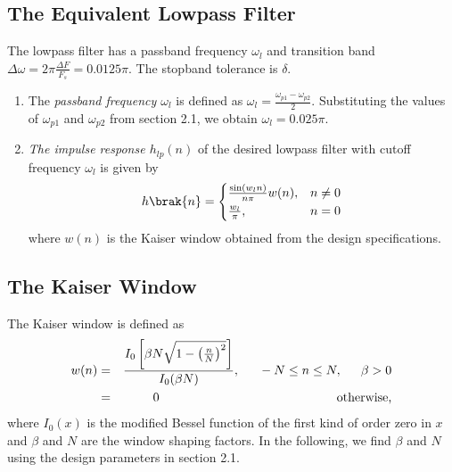 \documentclass{article}
\begin{document}
\subsection{The Equivalent Lowpass Filter}
The lowpass filter has a passband frequency $\omega_l$ and transition band $\Delta \omega = 2\pi \frac{\Delta F}{F_s} = 0.0125\pi$.
The stopband tolerance is $\delta$.
\begin{enumerate}
\item  The {\em passband frequency $\omega_l$}  is defined as $\omega_l = \frac{\omega_{p1} - \omega_{p2}}{2}$.  Substituting the values of $\omega_{p1}$ and $\omega_{p2}$ from section 2.1, we obtain $\omega_l = 0.025\pi$.

\item {\em The impulse response $h_{lp}(n)$} of the desired lowpass filter with cutoff frequency $\omega_l$
is given by
\begin{align}
    h\brak{n} = 
    \begin{cases} 
        \frac{\sin(w_l n)}{n\pi} w(n), &  n \neq 0 \\
        \frac{w_l}{\pi}, &  n = 0
    \end{cases} \label{firlpdef}
\end{align}
where $w(n)$ is the Kaiser window obtained from the design specifications.
\end{enumerate}

\subsection{The Kaiser Window}
The Kaiser window is defined as
\begin{eqnarray}
\label{kaiser}
w(n) &=& \frac{I_0\left[ \beta N \sqrt{1 - \left(\frac{n}{N}\right)^2} \right]}{I_0(\beta N)},
\indent -N \leq n \leq N, \indent \beta > 0 \nonumber \\
&=& 0 \hspace{5cm} \mbox{otherwise,}
\end{eqnarray}
where $I_0(x)$ is the modified Bessel function of the first kind of order zero in $x$ and $\beta$
and $N$ are the window shaping factors.  In the following,
we find $\beta$ and $N$ using the design parameters in section 2.1.
\end{document}

